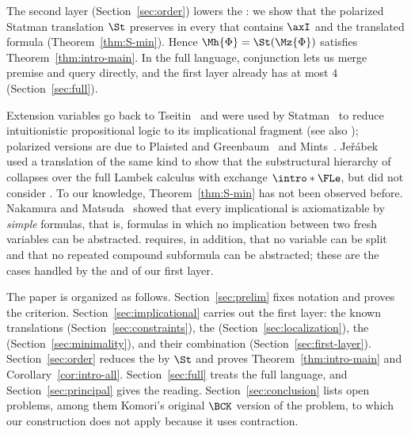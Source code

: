 The second layer (Section~\ref{sec:order}) lowers the : we show
that the polarized Statman translation $\St$ preserves  in
every  that contains $\axI$ and the translated formula
(Theorem~\ref{thm:S-min}). Hence $\Mh{\Phi}=\St(\Mz{\Phi})$ satisfies
Theorem~\ref{thm:intro-main}. In the full language, conjunction lets us
merge premise and query directly, and the first layer already has
 at most $4$ (Section~\ref{sec:full}).

Extension variables go back to Tseitin~\cite{Tse68} and were used by
Statman~\cite{Sta79} to reduce intuitionistic propositional logic to its
implicational fragment (see also \cite{Sve03}); polarized versions are due to
Plaisted and Greenbaum~\cite{PG86} and Mints~\cite{Min90}.
Jeřábek~\cite{Jer16} used a translation of the same kind to show that the
substructural hierarchy of~\cite{CGT08} collapses over the full Lambek calculus with exchange $\intro*\FLe$, but did not
consider . To our knowledge, Theorem~\ref{thm:S-min} has not
been observed before. Nakamura and Matsuda~\cite[Proposition~3.3]{NM21}
showed that every implicational  is axiomatizable by
\emph{simple} formulas, that is, formulas in which no implication between
two fresh variables can be abstracted.  requires, in
addition, that no variable can be split and that no repeated compound
subformula can be abstracted; these are the cases handled by the
 and  of our first layer.

The paper is organized as follows. Section~\ref{sec:prelim} fixes
notation and proves the  criterion.
Section~\ref{sec:implicational} carries out the first layer: the known
translations (Section~\ref{sec:constraints}), the 
(Section~\ref{sec:localization}), the 
(Section~\ref{sec:minimality}), and their combination
(Section~\ref{sec:first-layer}).
Section~\ref{sec:order} reduces the  by $\St$ and proves
Theorem~\ref{thm:intro-main} and Corollary~\ref{cor:intro-all}.
Section~\ref{sec:full} treats the full language, and
Section~\ref{sec:principal} gives the  reading.
Section~\ref{sec:conclusion} lists open problems, among them Komori's
original $\BCK$ version of the problem, to which our construction does not
apply because it uses contraction.
